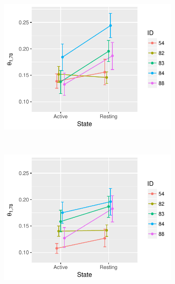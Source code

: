 \documentclass{article}
\begin{document}
\begin{figure}
    \centering
    \begin{subfigure}[b]{0.3\textwidth}
        \includegraphics[width=\textwidth]{fmriHier.pdf}
        \caption{}
        \label{fig:GivensReduction}
    \end{subfigure}
    ~ %
    \begin{subfigure}[b]{0.3\textwidth}
        \includegraphics[width=\textwidth]{fmri.pdf}
        \caption{}
        \label{fig:StiefelGeom}
    \end{subfigure}
    ~ %

\end{figure}
\end{document}
